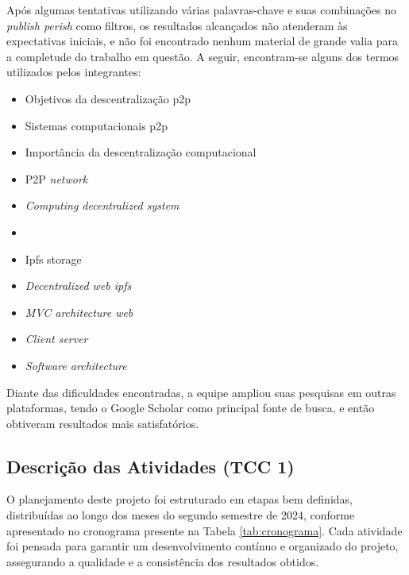 Após algumas tentativas utilizando várias palavras-chave e suas combinações no \textit{publish perish} como filtros, os resultados alcançados não atenderam às expectativas iniciais, e não foi encontrado nenhum material de grande valia para a completude do trabalho em questão. A seguir, encontram-se alguns dos termos utilizados pelos integrantes: 

\begin{itemize}
    \item Objetivos da descentralização p2p
    \item Sistemas computacionais p2p
    \item Importância da descentralização computacional
    \item P2P \textit{network}
    \item \textit{Computing decentralized system}
    \item {}
    \item Ipfs storage
    \item \textit{Decentralized web ipfs}
    \item \textit{MVC architecture web}
    \item \textit{Client server}
    \item \textit{Software architecture}
\end{itemize}

Diante das dificuldades encontradas, a equipe ampliou suas pesquisas em outras plataformas, tendo o Google Scholar como principal fonte de busca, e então obtiveram resultados mais satisfatórios. 

\subsection{Descrição das Atividades (TCC 1)}
O planejamento deste projeto foi estruturado em etapas bem definidas, distribuídas ao longo dos meses do segundo semestre de 2024, conforme apresentado no cronograma presente na Tabela \ref{tab:cronograma}. Cada atividade foi pensada para garantir um desenvolvimento contínuo e organizado do projeto, assegurando a qualidade e a consistência dos resultados obtidos.


